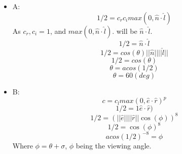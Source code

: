 \begin{itemize}

\item A:
$$1/2 = c_rc_i max(0,\hat n \cdot \hat l)$$ As $c_r,c_i =1$, and $max(0,\hat n \cdot \hat l)$. will be $\hat n \cdot \hat l$. 
$$1/2 = \hat n \cdot \hat l$$ 
$$1/2 = cos(\theta)||\hat n|| ||\hat l||$$
$$1/2 = cos(\theta)$$
$$\theta = acos(1/2)$$
$$\theta = 60(deg)$$

\item B:
$$c = c_l max(0, \hat e \cdot \hat r )^p$$
$$1/2 = 1 \hat e \cdot \hat r)$$
$$1/2 = (|| \hat e || || \hat r || \cos(\phi))^8 $$
$$1/2 = \cos(\phi)^8$$
$$acos(1/2)^{-8} = \phi$$  
Where $\phi = \theta + \sigma$, $\phi$ being the viewing angle.

\end{itemize}
